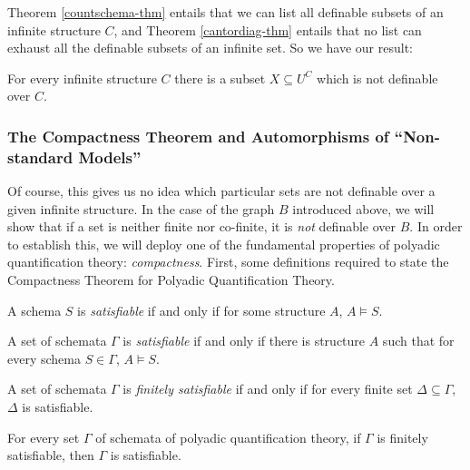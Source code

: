 Theorem \ref{countschema-thm} entails that we can list all definable subsets of an infinite structure $C$, and Theorem \ref{cantordiag-thm} entails that no list can exhaust all the definable subsets of an infinite set. So we have our result:

\begin{corollary}
For every infinite structure $C$ there is a subset $X\subseteq U^C$ which is not definable over $C$.
\end{corollary}

\subsubsection*{The Compactness Theorem and Automorphisms of ``Non-standard Models''}

Of course, this gives us no idea which particular sets are not definable over a given infinite structure. In the case of the graph $B$ introduced above, we will show that if a set is neither finite nor co-finite, it is \emph{not} definable over $B$. In order to establish this, we will deploy one of the fundamental properties of polyadic quantification theory: \emph{compactness}. First, some definitions required to state the Compactness Theorem for Polyadic Quantification Theory.

\begin{definition}
A schema $S$ is \emph{satisfiable} if and only if for some structure $A$, $A\models S$.
\end{definition}

\begin{definition}
A set of schemata $\Gamma$ is \emph{satisfiable} if and only if there is structure $A$ such that for every schema $S\in \Gamma$, $A\models S$.
\end{definition}

\begin{definition}
A set of schemata $\Gamma$ is \emph{finitely satisfiable} if and only if for every finite set $\Delta\subseteq\Gamma$, $\Delta$ is satisfiable.
\end{definition}

\begin{theorem}\label{compact-thm}
For every set $\Gamma$ of schemata  of polyadic quantification theory, if $\Gamma$ is finitely satisfiable, then $\Gamma$ is satisfiable. 
\end{theorem}

